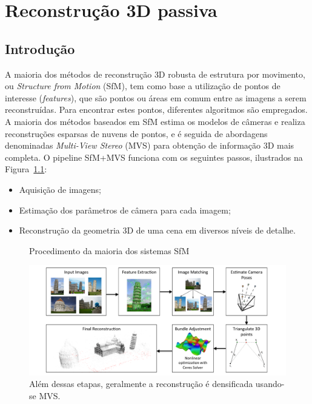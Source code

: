 \chapter{Reconstrução 3D passiva}\label{cap:pontosdeinteresse}
%
\section{Introdução}

A maioria dos métodos de reconstrução 3D robusta de estrutura por movimento, ou \emph{Structure
from Motion} (SfM), tem como base a utilização de pontos de interesse
(\emph{features}), que são pontos ou áreas em comum entre as imagens a serem
reconstruídas. Para encontrar estes pontos, diferentes algoritmos são empregados. 
A maioria dos métodos baseados em SfM estima os modelos de câmeras e
realiza reconstruções esparsas de nuvens de pontos, e é seguida de abordagens denominadas
\emph{Multi-View Stereo} (MVS) para obtenção de informação 3D mais completa.  O
pipeline SfM+MVS funciona com os seguintes passos, ilustrados na Figura~\ref{fig:sfmpipeline}:

\begin{itemize}
\item{Aquisição de imagens;}
\item{Estimação dos parâmetros de câmera para cada imagem;}
\item{Reconstrução da geometria 3D de uma cena em diversos níveis de detalhe.}
\end{itemize}

\begin{figure}[!h]
	\centering
	\caption{Procedimento da maioria dos sistemas SfM}
	\includegraphics[width=\linewidth]{figs/pipelinesfm.png}
	\caption{%
	Além dessas etapas, geralmente a reconstrução é densificada usando-se MVS.
	}
   \label{fig:sfmpipeline}
\end{figure}

